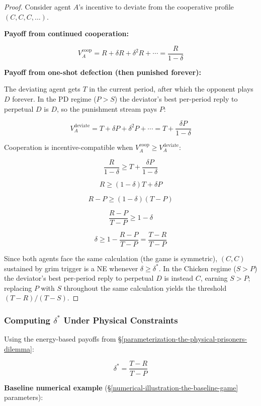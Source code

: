 \documentclass[11pt]{article}
\theoremstyle{plain}
\theoremstyle{definition}
\theoremstyle{remark}
\let\origsubsubsection\subsubsection
\renewcommand{\subsubsection}{\needspace{4\baselineskip}\origsubsubsection}
\begin{document}
\begin{proof}
Consider agent $A$'s incentive to deviate from the cooperative profile $(C, C, C, \ldots)$.

\textbf{Payoff from continued cooperation:}

$$V_A^{\text{coop}} = R + \delta R + \delta^2 R + \cdots = \frac{R}{1 - \delta}$$

\textbf{Payoff from one-shot defection (then punished forever):}

The deviating agent gets $T$ in the current period, after which the opponent plays $D$ forever. In the PD regime ($P > S$) the deviator's best per-period reply to perpetual $D$ is $D$, so the punishment stream pays $P$:

$$V_A^{\text{deviate}} = T + \delta P + \delta^2 P + \cdots = T + \frac{\delta P}{1 - \delta}$$

Cooperation is incentive-compatible when $V_A^{\text{coop}} \geq V_A^{\text{deviate}}$:

$$\frac{R}{1 - \delta} \geq T + \frac{\delta P}{1 - \delta}$$

$$R \geq (1 - \delta) T + \delta P$$

$$R - P \geq (1 - \delta)(T - P)$$

$$\frac{R - P}{T - P} \geq 1 - \delta$$

$$\delta \geq 1 - \frac{R - P}{T - P} = \frac{T - R}{T - P}$$

Since both agents face the same calculation (the game is symmetric), $(C, C)$ sustained by grim trigger is a NE whenever $\delta \geq \delta^*$. In the Chicken regime ($S > P$) the deviator's best per-period reply to perpetual $D$ is instead $C$, earning $S > P$; replacing $P$ with $S$ throughout the same calculation yields the threshold $(T - R)/(T - S)$.
\end{proof}

\subsubsection{\texorpdfstring{Computing \(\delta^*\) Under Physical
Constraints}{Computing \textbackslash delta\^{}* Under Physical Constraints}}\label{computing-delta-star}

Using the energy-based payoffs from
§\ref{parameterization-the-physical-prisoners-dilemma}:

\[\delta^* = \frac{T - R}{T - P}\]

\textbf{Baseline numerical example}
(§\ref{numerical-illustration-the-baseline-game} parameters):
\end{document}
